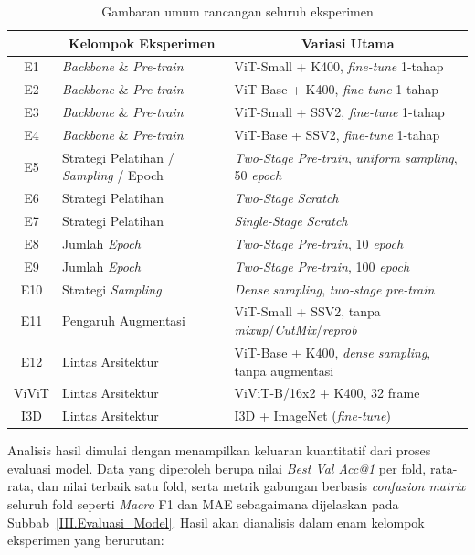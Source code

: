 \begin{table}[H]
\centering
\caption{Gambaran umum rancangan seluruh eksperimen}
\label{tab:3.rancangan_eksperimen}
\footnotesize
\begin{tabularx}{\linewidth}{|c|p{3.2cm}|X|}
\hline
\rowcolor{gray!15} \multicolumn{1}{|c|}{\textbf{Kode}} & \multicolumn{1}{c|}{\textbf{Kelompok Eksperimen}} & \multicolumn{1}{c|}{\textbf{Variasi Utama}} \\
\hline
E1  & \textit{Backbone} \& \textit{Pre-train} & ViT-Small + K400, \textit{fine-tune} 1-tahap \\
\hline
E2  & \textit{Backbone} \& \textit{Pre-train} & ViT-Base + K400, \textit{fine-tune} 1-tahap \\
\hline
E3  & \textit{Backbone} \& \textit{Pre-train} & ViT-Small + SSV2, \textit{fine-tune} 1-tahap \\
\hline
E4  & \textit{Backbone} \& \textit{Pre-train} & ViT-Base + SSV2, \textit{fine-tune} 1-tahap \\
\hline
E5  & Strategi Pelatihan / \textit{Sampling} / Epoch & \textit{Two-Stage Pre-train}, \textit{uniform sampling}, 50 \textit{epoch} \\
\hline
E6  & Strategi Pelatihan & \textit{Two-Stage Scratch} \\
\hline
E7  & Strategi Pelatihan & \textit{Single-Stage Scratch} \\
\hline
E8  & Jumlah \textit{Epoch} & \textit{Two-Stage Pre-train}, 10 \textit{epoch} \\
\hline
E9 & Jumlah \textit{Epoch} & \textit{Two-Stage Pre-train}, 100 \textit{epoch} \\
\hline
E10 & Strategi \textit{Sampling} & \textit{Dense sampling}, \textit{two-stage pre-train} \\
\hline
E11 & Pengaruh Augmentasi & ViT-Small + SSV2, tanpa \textit{mixup}/\textit{CutMix}/\textit{reprob} \\
\hline
E12 & Lintas Arsitektur & ViT-Base + K400, \textit{dense sampling}, tanpa augmentasi \\
\hline
ViViT & Lintas Arsitektur & ViViT-B/16x2 + K400, 32 frame \\
\hline
I3D & Lintas Arsitektur & I3D + ImageNet (\textit{fine-tune}) \\
\hline
\end{tabularx}
\end{table}
Analisis hasil dimulai dengan menampilkan keluaran kuantitatif dari proses evaluasi model. Data yang diperoleh berupa nilai \textit{Best Val Acc@1} per fold, rata-rata, dan nilai terbaik satu fold, serta metrik gabungan berbasis \textit{confusion matrix} seluruh fold seperti \textit{Macro} F1 dan MAE sebagaimana dijelaskan pada Subbab~\ref{III.Evaluasi_Model}. Hasil akan dianalisis dalam enam kelompok eksperimen yang berurutan:\par
